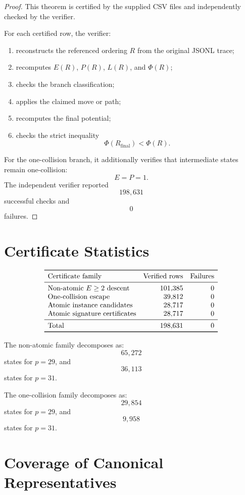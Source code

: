 \documentclass[11pt]{article}
\newcommand{\PhiPot}{\Phi}
\begin{document}
\begin{proof}
This theorem is certified by the supplied CSV files and independently checked by the verifier.

For each certified row, the verifier:
\begin{enumerate}
\item reconstructs the referenced ordering \(R\) from the original JSONL trace;
\item recomputes \(E(R)\), \(P(R)\), \(L(R)\), and \(\PhiPot(R)\);
\item checks the branch classification;
\item applies the claimed move or path;
\item recomputes the final potential;
\item checks the strict inequality
\[
\PhiPot(R_{\mathrm{final}})<\PhiPot(R).
\]
\end{enumerate}

For the one-collision branch, it additionally verifies that intermediate states remain one-collision:
\[
E=P=1.
\]
The independent verifier reported
\[
198{,}631
\]
successful checks and
\[
0
\]
failures.
\end{proof}

\section{Certificate Statistics}

\[
\begin{array}{lrr}
\toprule
\text{Certificate family} & \text{Verified rows} & \text{Failures}\\
\midrule
\text{Non-atomic }E\ge2\text{ descent} & 101{,}385 & 0\\
\text{One-collision escape} & 39{,}812 & 0\\
\text{Atomic instance candidates} & 28{,}717 & 0\\
\text{Atomic signature certificates} & 28{,}717 & 0\\
\midrule
\text{Total} & 198{,}631 & 0\\
\bottomrule
\end{array}
\]

The non-atomic family decomposes as:
\[
65{,}272
\]
states for \(p=29\), and
\[
36{,}113
\]
states for \(p=31\).

The one-collision family decomposes as:
\[
29{,}854
\]
states for \(p=29\), and
\[
9{,}958
\]
states for \(p=31\).

\section{Coverage of Canonical Representatives}
\end{document}
